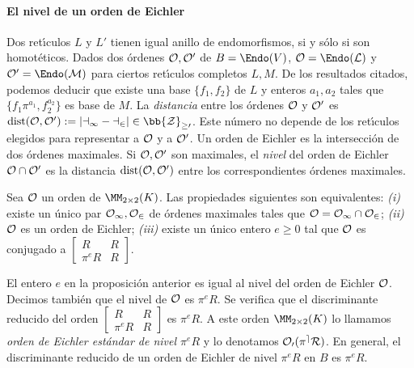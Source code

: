 \paragraph{El nivel de un orden de Eichler}
Dos ret\'{\i}culos $L$ y $L'$ tienen igual anillo de endomorfismos, si
y s\'{o}lo si son homot\'{e}ticos. Dados dos \'{o}rdenes $\cal{O},\cal{O}'$
de $B=\Endo(V)$, $\cal{O}=\Endo(L)$ y $\cal{O}'=\Endo(M)$ para ciertos
ret\'{\i}culos completos $L,M$. De los resultados citados, podemos deducir
que existe una base $\{f_{1},f_{2}\}$ de $L$ y enteros $a_{1},a_{2}$ tales
que $\{f_{1}\pi^{a_{1}},f_{2}^{a_{2}}\}$ es base de $M$. La \emph{distancia}
entre los \'{o}rdenes $\cal{O}$ y $\cal{O}'$ es
$\mathrm{dist}(\cal{O},\cal{O}'):=|a_{1}-a_{2}|\in\bb{Z}_{\geq 0}$.
Este n\'{u}mero no depende de los ret\'{\i}culos elegidos para representar
a $\cal{O}$ y a $\cal{O}'$. Un orden de Eichler es la intersecci\'{o}n
de dos \'{o}rdenes maximales. Si $\cal{O},\cal{O}'$ son maximales,
el \emph{nivel} del orden de Eichler $\cal{O}\cap\cal{O}'$ es la
distancia $\mathrm{dist}(\cal{O},\cal{O}')$ entre los correspondientes
\'{o}rdenes maximales.

\begin{propoOrdEichlerSplitAlg}
 Sea $\cal{O}$ un orden de $\MM_{2\times 2}(K)$. Las propiedades
 siguientes son equivalentes:
 \textit{(i)} existe un \'{u}nico par $\cal{O}_{1},\cal{O}_{2}$ de
 \'{o}rdenes maximales tales que $\cal{O}=\cal{O}_{1}\cap\cal{O}_{2}$;
 \textit{(ii)} $\cal{O}$ es un orden de Eichler;
 \textit{(iii)} existe un \'{u}nico entero $e\geq 0$ tal que $\cal{O}$
	es conjugado a $\begin{bmatrix} R & R \\ \pi^{e}R & R \end{bmatrix}$.
\end{propoOrdEichlerSplitAlg}

El entero $e$ en la proposici\'{o}n anterior es igual al nivel del orden
de Eichler $\cal{O}$. Decimos tambi\'{e}n que el nivel de $\cal{O}$ es
$\pi^{e}R$. Se verifica que el discriminante reducido del orden
$\begin{bmatrix} R & R \\ \pi^{e}R & R \end{bmatrix}$ es $\pi^{e}R$.
A este orden $\MM_{2\times 2}(K)$ lo llamamos
\emph{orden de Eichler est\'{a}ndar de nivel $\pi^{e}R$} y lo denotamos
$\cal{O}_{0}(\pi^{e}R)$. En general, el discriminante reducido de un orden
de Eichler de nivel $\pi^{e}R$ en $B$ es $\pi^{e}R$.

